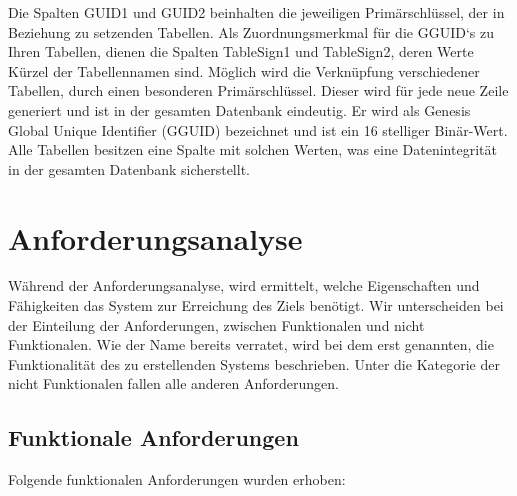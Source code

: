 Die Spalten GUID1 und GUID2 beinhalten die jeweiligen Primärschlüssel, der in Beziehung zu setzenden Tabellen. Als Zuordnungsmerkmal für die GGUID`s zu Ihren Tabellen, dienen die Spalten TableSign1 und TableSign2, deren Werte Kürzel der Tabellennamen sind. Möglich wird die Verknüpfung verschiedener Tabellen, durch einen besonderen Primärschlüssel. Dieser wird für jede neue Zeile generiert und ist in der gesamten Datenbank eindeutig. Er wird als Genesis Global Unique Identifier (GGUID) bezeichnet und ist ein 16 stelliger Binär-Wert. Alle Tabellen besitzen eine Spalte mit solchen Werten, was eine Datenintegrität in der gesamten Datenbank sicherstellt.

\section{Anforderungsanalyse}
\label{ch:Systemanalyse:sec:Anforderungsanalyse}

Während der Anforderungsanalyse, wird ermittelt, welche Eigenschaften und Fähigkeiten das System zur Erreichung des Ziels benötigt. Wir unterscheiden bei der Einteilung der Anforderungen, zwischen Funktionalen und nicht Funktionalen. Wie der Name bereits verratet, wird bei dem erst genannten, die Funktionalität des zu erstellenden Systems beschrieben. Unter die Kategorie der nicht Funktionalen fallen alle anderen Anforderungen. 

\subsection{Funktionale Anforderungen}

Folgende funktionalen Anforderungen wurden erhoben:

